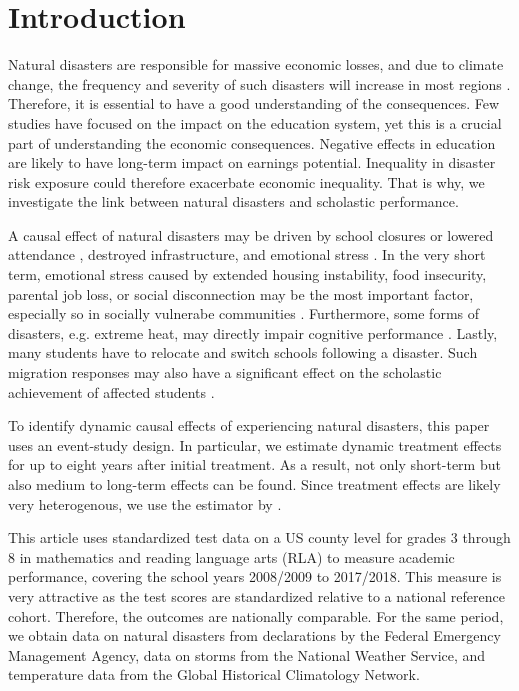 
\section{Introduction}

Natural disasters are responsible for massive economic losses, and due to climate change, the frequency and severity of such disasters will increase in most regions \citep{IPCC_2021}. Therefore, it is essential to have a good understanding of the consequences. Few studies have focused on the impact on the education system, yet this is a crucial part of understanding the economic consequences. Negative effects in education are likely to have long-term impact on earnings potential. Inequality in disaster risk exposure could therefore exacerbate economic inequality. That is why, we investigate the link between natural disasters and scholastic performance.

A causal effect of natural disasters may be driven by school closures \citep{Grewening_2020} or lowered attendance \citep{Spencer_2016}, destroyed infrastructure, and emotional stress \citep{Vogel_2016}. In the very short term, emotional stress caused by extended housing instability, food insecurity, parental job loss, or social disconnection may be the most important factor, especially so in socially vulnerabe communities \citep{Gao_2022}. Furthermore, some forms of disasters, e.g. extreme heat, may directly impair cognitive performance \citep{Ramsey_1995}. Lastly, many students have to relocate and switch schools following a disaster. Such migration responses may also have a significant effect on the scholastic achievement of affected students \citep{Pane_2008, Sacerdote_2012}.

To identify dynamic causal effects of experiencing natural disasters, this paper uses an event-study design. In particular, we estimate dynamic treatment effects for up to eight years after initial treatment. As a result, not only short-term but also medium to long-term effects can be found. Since treatment effects are likely very heterogenous, we use the estimator by \cite{Sun_2021}.

This article uses standardized test data on a US county level for grades 3 through 8 in mathematics and reading language arts (RLA) to measure academic performance, covering the school years 2008/2009 to 2017/2018. This measure is very attractive as the test scores are standardized relative to a national reference cohort. Therefore, the outcomes are nationally comparable. For the same period, we obtain data on natural disasters from declarations by the Federal Emergency Management Agency, data on storms from the National Weather Service, and temperature data from the Global Historical Climatology Network.

